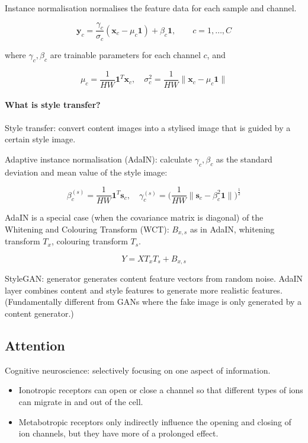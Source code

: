 Instance normalisation normalises the feature data for each sample and channel.

$$
\bm{y}_c = \frac{\gamma_c}{\sigma_c} (\bm{x}_c - \mu_c \bm{1}) + \beta_c  \bm{1}, \qquad c = 1, \dots, C
$$

where $\gamma_c, \beta_c$ are trainable parameters for each channel $c$, and

$$
\mu_c = \frac{1}{HW} \bm{1}^T \bm{x}_c, \quad
\sigma_c^2 = \frac{1}{HW} \lVert \bm{x}_c - \mu_c \bm{1} \rVert
$$

\paragraph{What is style transfer?}

Style transfer: convert content images into a stylised image
that is guided by a certain style image.

Adaptive instance normalisation (AdaIN): calculate $\gamma_c, \beta_c$
as the standard deviation and mean value of the style image:

$$
\beta_c^{(s)} = \frac{1}{HW} \bm{1}^T \bm{s}_c, \quad
\gamma_c^{(s)} = \big( \frac{1}{HW} \lVert \bm{s}_c - \beta_c^2 \bm{1} \rVert \big)^\frac{1}{2}
$$

AdaIN is a special case (when the covariance matrix is diagonal) of the
Whitening and Colouring Transform (WCT):
$B_{x, s}$ as in AdaIN, whitening transform $T_x$,
colouring transform $T_s$.

$$Y = X T_x T_s + B_{x, s}$$

StyleGAN: generator generates content feature vectors from random noise.
AdaIN layer combines content and style features to generate more realistic features.
(Fundamentally different from GANs where the fake image is only generated by a content generator.)

\newpage
\subsection{Attention}

Cognitive neuroscience: selectively focusing on one aspect of information.

\begin{itemize}
    \item Ionotropic receptors can open or close a channel
          so that different types of ions can migrate in and out of the cell.
    \item Metabotropic receptors only indirectly influence the opening and closing of ion channels,
          but they have more of a prolonged effect.
\end{itemize}

